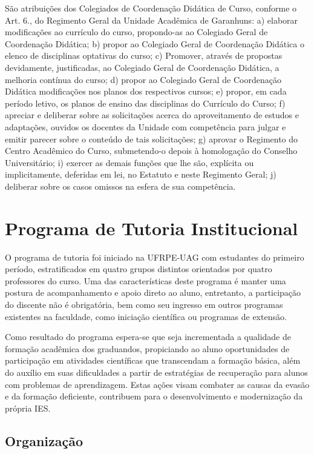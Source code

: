 \documentclass[
	12pt,				%
	openright,			%
  oneside,     %
	a4paper,			%
	english,			%
	french,				%
	spanish,			%
	brazil				%
	]{abntex2}
\begin{document}
São atribuições dos Colegiados de Coordenação
Didática de Curso, conforme o Art. 6., do Regimento Geral da Unidade Acadêmica de Garanhuns: 
a) elaborar modificações ao currículo do curso,  propondo-as
ao Colegiado Geral de Coordenação Didática; b) propor ao Colegiado Geral de 
Coordenação Didática o elenco de disciplinas optativas do curso; c) Promover, 
através de propostas devidamente, justificadas, ao Colegiado Geral de
Coordenação Didática,  a melhoria contínua do curso; d) propor ao Colegiado
Geral de  Coordenação Didática modificações nos planos dos respectivos cursos; 
e) propor, em cada período letivo, os planos de ensino das disciplinas do
Currículo do Curso;  f) apreciar e deliberar sobre as solicitações acerca do 
aproveitamento de estudos e adaptações, ouvidos os docentes da Unidade com 
competência para julgar e emitir parecer sobre o conteúdo de tais solicitações; 
g) aprovar o Regimento do Centro Acadêmico do Curso, submetendo-o depois à 
homologação do Conselho Universitário; i) exercer as demais funções que lhe são,
explícita ou implicitamente, deferidas em lei, no Estatuto e neste Regimento
Geral;  j) deliberar sobre os casos omissos na esfera de sua competência.

\section{Programa de Tutoria Institucional}

O programa de tutoria foi iniciado na UFRPE-UAG com estudantes do primeiro período, estratificados em quatro grupos distintos orientados por quatro professores do curso. Uma das  características deste programa é manter uma postura de  acompanhamento e apoio direto ao aluno, entretanto, a participação do discente não é obrigatória, bem como seu ingresso em outros programas existentes na faculdade, como iniciação científica ou programas de extensão.

Como resultado do programa espera-se que seja incrementada a qualidade de formação acadêmica dos graduandos, propiciando ao aluno oportunidades de participação em atividades científicas que transcendam a formação básica, além do auxílio em suas dificuldades a partir de estratégias de recuperação para alunos com problemas de aprendizagem. Estas ações visam combater as causas da evasão e da formação deficiente, contribuem para o desenvolvimento e modernização da própria IES.

\subsection{Organização}
\end{document}
